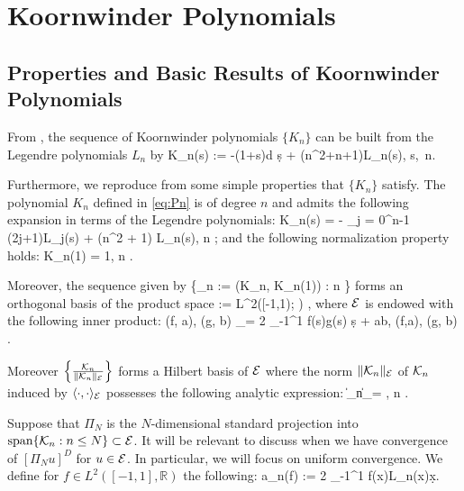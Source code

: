 
\section{Koornwinder Polynomials}


\subsection{Properties and Basic Results of Koornwinder Polynomials}

From \cite[Eq.~(2.1)]{Koornwinder}, the sequence of Koornwinder polynomials \(\{K_n\}\) can be built from the Legendre polynomials \(L_n\) by 
\be\label{eq:Pn}
    K_n(s) := -(1+s)\frac d {\d s} + (n^2+n+1)L_n(s), \quad s\in[-1,1],\  n\in\Nzero.
\ee

Furthermore, we reproduce from \cite[Prop.~3.1]{GalerkinApprox} some simple properties that \(\{K_n\}\) satisfy.
\bprop
The polynomial \(K_n\) defined in \eqref{eq:Pn} is of degree \(n\) and  admits the following expansion in terms of the Legendre polynomials:
\be\label{eq:Pn2}
    K_n(s) = - \sum_{j = 0}^{n-1} (2j+1)L_j(s) + (n^2 + 1) L_n(s), \qquad n \in \Nzero;
\ee
and the following normalization property holds:
\be
    K_n(1) = 1, \qquad n \in {}.
\ee

Moreover, the sequence given by
\be
    \{_n := (K_n, K_n(1)) : n \in \Nzero\}
\ee 
forms an orthogonal basis of the  product space 
\be
     := L^2([-1,1); ) \times  {},
\ee 
where \(\mathcal E\) is endowed with the following inner product:
\be
    \langle (f, a), (g, b) \rangle_\mcE =  2 \int_{-1}^1 f(s)g(s) \d s  + ab, \quad (f,a), (g, b) \in \mcE.
\ee

Moreover \(\left\{ \frac{\mathcal K_n}{\| \mathcal K_n \|_\mathcal E} \right\}\) forms a Hilbert basis of $\mathcal E$ where 
the norm \(\| \mathcal K_n \|_\mathcal E\) of \(\mathcal K_n\) induced by  \(\langle \cdot, \cdot \rangle_\mathcal E\)  possesses the following analytic expression:
\be \label{eq:Pn_norm}
    \|\mcK_n\|_\mcE = , \qquad n \in \Nzero.
\ee
\eprop

Suppose that \(\Pi_N\) is the \(N\)-dimensional standard projection into \(\mbox{span}\{\mathcal K_n: n\leq N\} \subset \mathcal E\). It will be relevant to discuss when we have convergence of \([\Pi_N u]^D\) for \(u\in\mathcal E\). In particular, we will focus on uniform convergence. We define for \(f\in L^2([-1,1], \mathbb R)\) the following:
\be
a_n(f) :=  2 \int_{-1}^1 f(x)L_n(x)\d x.
\ee

